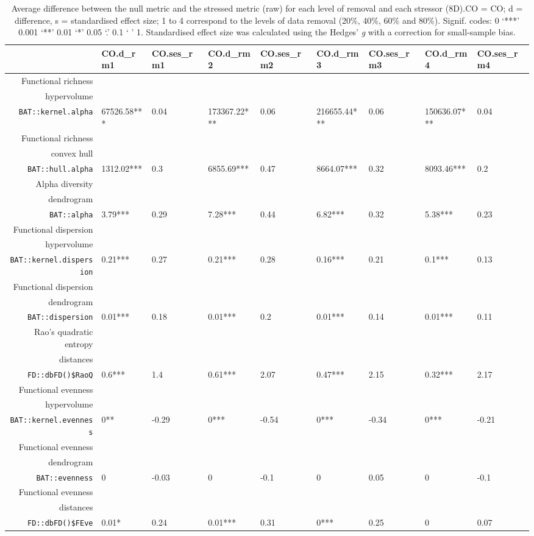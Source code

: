 \begin{table}[ht]
\centering
\scriptsize
\begin{tabular}{rllllllll}
  \hline
 & CO.d\_rm1 & CO.ses\_rm1 & CO.d\_rm2 & CO.ses\_rm2 & CO.d\_rm3 & CO.ses\_rm3 & CO.d\_rm4 & CO.ses\_rm4 \\ 
  \hline
  Functional richness\\ hypervolume\\ \texttt{BAT::kernel.alpha} & 67526.58*** & 0.04 & 173367.22*** & 0.06 & 216655.44*** & 0.06 & 150636.07*** & 0.04 \\ 
  Functional richness\\ convex hull\\ \texttt{BAT::hull.alpha} & 1312.02*** & 0.3 & 6855.69*** & 0.47 & 8664.07*** & 0.32 & 8093.46*** & 0.2 \\ 
  Alpha diversity\\ dendrogram\\ \texttt{BAT::alpha} & 3.79*** & 0.29 & 7.28*** & 0.44 & 6.82*** & 0.32 & 5.38*** & 0.23 \\ 
  Functional dispersion\\ hypervolume\\ \texttt{BAT::kernel.dispersion} & 0.21*** & 0.27 & 0.21*** & 0.28 & 0.16*** & 0.21 & 0.1*** & 0.13 \\ 
  Functional dispersion\\ dendrogram\\ \texttt{BAT::dispersion} & 0.01*** & 0.18 & 0.01*** & 0.2 & 0.01*** & 0.14 & 0.01*** & 0.11 \\ 
  Rao's quadratic entropy\\ distances\\ \texttt{FD::dbFD()\$RaoQ} & 0.6*** & 1.4 & 0.61*** & 2.07 & 0.47*** & 2.15 & 0.32*** & 2.17 \\ 
  Functional evenness\\ hypervolume\\ \texttt{BAT::kernel.evenness} & 0** & -0.29 & 0*** & -0.54 & 0*** & -0.34 & 0*** & -0.21 \\ 
  Functional evenness\\ dendrogram\\ \texttt{BAT::evenness} & 0 & -0.03 & 0 & -0.1 & 0 & 0.05 & 0 & -0.1 \\ 
  Functional evenness\\ distances\\ \texttt{FD::dbFD()\$FEve} & 0.01* & 0.24 & 0.01*** & 0.31 & 0*** & 0.25 & 0 & 0.07 \\ 
   \hline
\end{tabular}
\caption{Average difference between the null metric and the stressed metric (raw) for each level of removal and each stressor (8D).CO = CO; d = difference, s = standardised effect size; 1 to 4 correspond to the levels of data removal (20\%, 40\%, 60\% and 80\%). Signif. codes:  0 ‘***’ 0.001 ‘**’ 0.01 ‘*’ 0.05 ‘.’ 0.1 ‘ ’ 1. Standardised effect size was calculated using the Hedges' \textit{g} with a correction for small-sample bias.} 
\end{table}

